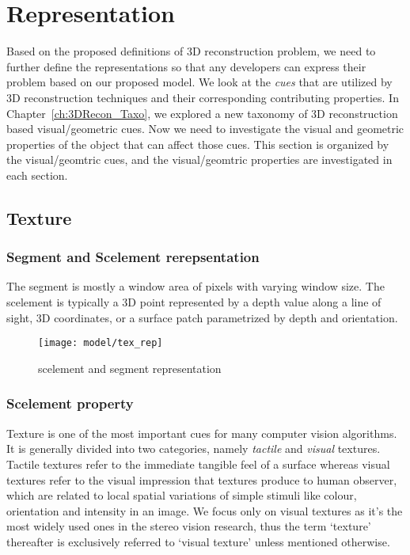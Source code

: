 \section{Representation}
\label{sec:3DRecon_Rep}
Based on the proposed definitions of 3D reconstruction problem, we need to further define the representations so that any developers can express their problem based on our proposed model. We look at the \textit{cues} that are utilized by 3D reconstruction techniques and their corresponding contributing properties. In Chapter~\ref{ch:3DRecon_Taxo}, we explored a new taxonomy of 3D reconstruction based visual/geometric cues. Now we need to investigate the visual and geometric properties of the object that can affect those cues. This section is organized by the visual/geomtric cues, and the visual/geomtric properties are investigated in each section.

\subsection{Texture}
\subsubsection{Segment and Scelement rerepsentation}
The segment is mostly a window area of pixels with varying window size. The scelement is typically a 3D point represented by a depth value along a line of sight, 3D coordinates, or a surface patch parametrized by depth and orientation.
\begin{figure}[h]
\centering
\texttt{[image: model/tex\_rep]}
\caption{scelement and segment representation}
\end{figure}

\subsubsection{Scelement property}
Texture is one of the most important cues for many computer vision algorithms. It is generally divided into two categories, namely \textit{tactile} and \textit{visual} textures. Tactile textures refer to the immediate tangible feel of a surface whereas visual textures refer to the visual impression that textures produce to human observer, which are related to local spatial variations of simple stimuli like colour, orientation and intensity in an image. We focus only on visual textures as it's the most widely used ones in the stereo vision research, thus the term `texture' thereafter is exclusively referred to `visual texture' unless mentioned otherwise.

